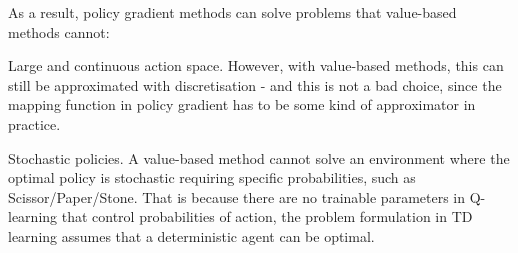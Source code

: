 \documentclass[12pt]{article}
\begin{document}
As a result, policy gradient methods can solve problems that value-based methods cannot:
\newline

Large and continuous action space. However, with value-based methods, this can still be approximated with discretisation - and this is not a bad choice, since the mapping function in policy gradient has to be some kind of approximator in practice.
\newline

Stochastic policies. A value-based method cannot solve an environment where the optimal policy is stochastic requiring specific probabilities, such as Scissor/Paper/Stone. That is because there are no trainable parameters in Q-learning that control probabilities of action, the problem formulation in TD learning assumes that a deterministic agent can be optimal.
\newline





\end{document}

